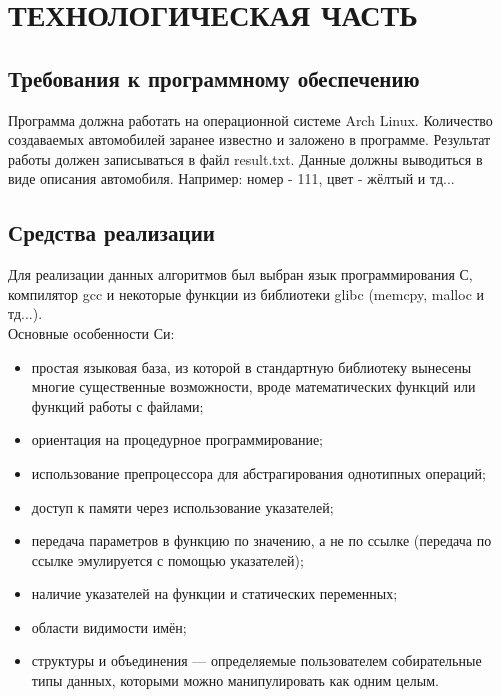\documentclass[a4paper,12pt]{article}
\begin{document}
\newpage
\section{ТЕХНОЛОГИЧЕСКАЯ ЧАСТЬ}
\subsection{Требования к программному обеспечению}
Программа должна работать на операционной системе Arch Linux. Количество создаваемых автомобилей заранее известно и заложено в программе. Результат работы должен записываться в файл result.txt. Данные должны выводиться в виде описания автомобиля. Например: номер - 111, цвет - жёлтый и тд...

\newpage
\subsection{Средства реализации}
Для реализации данных алгоритмов был выбран язык программирования С, компилятор gcc и некоторые функции из библиотеки glibc (memcpy, malloc и тд...). \\
Основные особенности Си:
\begin{itemize}
\item простая языковая база, из которой в стандартную библиотеку вынесены многие существенные возможности, вроде математических функций или функций работы с файлами;
\item ориентация на процедурное программирование;
\item использование препроцессора для абстрагирования однотипных операций;
\item доступ к памяти через использование указателей;
\item передача параметров в функцию по значению, а не по ссылке (передача по ссылке эмулируется с помощью указателей);
\item наличие указателей на функции и статических переменных;
\item области видимости имён;
\item структуры и объединения — определяемые пользователем собирательные типы данных, которыми можно манипулировать как одним целым.
\end{itemize}

\newpage
\end{document}
